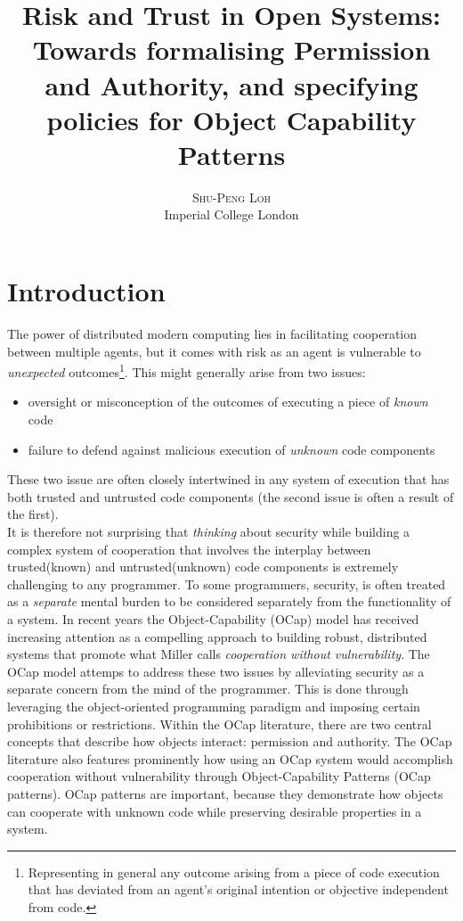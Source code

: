 \documentclass[a4paper,11pt,twoside]{article}
\title{Risk and Trust in Open Systems:\\ \Large Towards formalising Permission and Authority, and specifying policies for Object Capability Patterns} %
\author{%
\textsc{Shu-Peng Loh} \\[1ex] %
\normalsize Imperial College London \\ %
}
\date{} %
\begin{document}
\let\sf\textsf

\raggedbottom
\thispagestyle{empty}
\tableofcontents
\thispagestyle{empty}

\maketitle
\setcounter{page}{1}
\pagestyle{fancy} %


\section{Introduction}
The power of distributed modern computing lies in facilitating cooperation between multiple agents, but it comes with risk as an agent is vulnerable to \textit{unexpected} outcomes\footnote{Representing in general any outcome arising from a piece of code execution that has deviated from an agent's original intention or objective independent from code.}. This might generally arise from two issues: 
\begin{itemize}
\item oversight or misconception of the outcomes of executing a piece of \textit{known} code
\item failure to defend against malicious execution of \textit{unknown} code components\end{itemize}
\noindent These two issue are often closely intertwined in any system of execution that has both trusted and untrusted code components (the second issue is often a result of the first).\\

It is therefore not surprising that \textit{thinking} about security while building a complex system of cooperation that involves the interplay between trusted(known) and untrusted(unknown) code components is extremely challenging to any programmer. To some programmers, security, is often treated as a \textit{separate} mental burden to be considered separately from the functionality of a system. In recent years the Object-Capability (OCap) model has received increasing attention as a compelling approach to building robust, distributed systems that promote what Miller\cite{miller2006} calls \textit{cooperation without vulnerability}. The OCap model attemps to address these two issues by alleviating security as a separate concern from the mind of the programmer. This is done through leveraging the object-oriented programming paradigm and imposing certain prohibitions or restrictions. Within the OCap literature, there are two central concepts that describe how objects interact: permission and authority. The OCap literature also features prominently how using an OCap system would accomplish cooperation without vulnerability through Object-Capability Patterns (OCap patterns). OCap patterns are important, because they demonstrate how objects can cooperate with unknown code while preserving desirable properties in a system.\\
\end{document}
